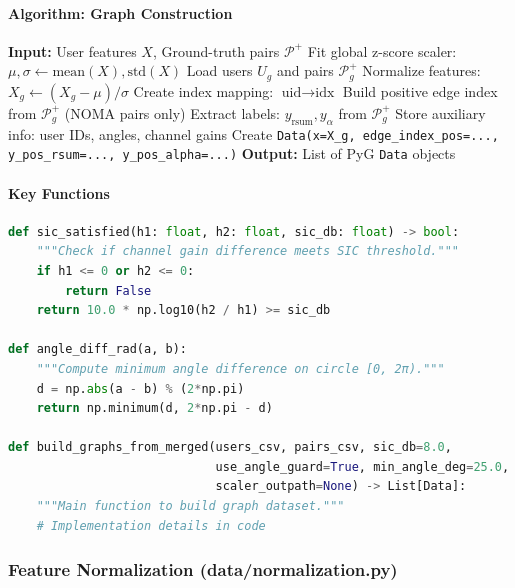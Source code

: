 \documentclass[12pt,a4paper]{article}
\begin{document}
\paragraph{Algorithm: Graph Construction}
\begin{algorithm}[H]
\caption{Build PyG Graph from Scenario}
\begin{algorithmic}[1]
\State \textbf{Input:} User features $X$, Ground-truth pairs $\mathcal{P}^+$
\State Fit global z-score scaler: $\mu, \sigma \leftarrow \text{mean}(X), \text{std}(X)$
    \State Load users $U_g$ and pairs $\mathcal{P}_g^+$
    \State Normalize features: $X_g \leftarrow (X_g - \mu) / \sigma$
    \State Create index mapping: $\text{uid} \rightarrow \text{idx}$
    \State Build positive edge index from $\mathcal{P}_g^+$ (NOMA pairs only)
    \State Extract labels: $y_{\text{rsum}}, y_{\alpha}$ from $\mathcal{P}_g^+$
    \State Store auxiliary info: user IDs, angles, channel gains
    \State Create \texttt{Data(x=X\_g, edge\_index\_pos=..., y\_pos\_rsum=..., y\_pos\_alpha=...)}
\EndFor
\State \textbf{Output:} List of PyG \texttt{Data} objects
\end{algorithmic}
\end{algorithm}

\paragraph{Key Functions}
\begin{lstlisting}[language=Python]
def sic_satisfied(h1: float, h2: float, sic_db: float) -> bool:
    """Check if channel gain difference meets SIC threshold."""
    if h1 <= 0 or h2 <= 0:
        return False
    return 10.0 * np.log10(h2 / h1) >= sic_db

def angle_diff_rad(a, b):
    """Compute minimum angle difference on circle [0, 2π)."""
    d = np.abs(a - b) % (2*np.pi)
    return np.minimum(d, 2*np.pi - d)

def build_graphs_from_merged(users_csv, pairs_csv, sic_db=8.0,
                             use_angle_guard=True, min_angle_deg=25.0,
                             scaler_outpath=None) -> List[Data]:
    """Main function to build graph dataset."""
    # Implementation details in code
\end{lstlisting}

\subsubsection{Feature Normalization (data/normalization.py)}
\end{document}
